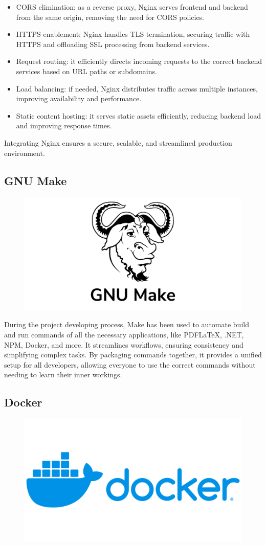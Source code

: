 \begin{itemize}

    \item CORS elimination: as a reverse proxy, Nginx serves frontend and backend from the same origin, removing the need for CORS policies.
    \item HTTPS enablement: Nginx handles TLS termination, securing traffic with HTTPS and offloading SSL processing from backend services.
    \item Request routing: it efficiently directs incoming requests to the correct backend services based on URL paths or subdomains.
    \item Load balancing: if needed, Nginx distributes traffic across multiple instances, improving availability and performance.
    \item Static content hosting: it serves static assets efficiently, reducing backend load and improving response times.

\end{itemize}

Integrating Nginx ensures a secure, scalable, and streamlined production environment.

\subsection{GNU Make}

\begin{figure}[H]
    \hfill
    \includegraphics[width=0.1\linewidth]{../assets/tools-logos/make.png}
    \hspace{1cm}
\end{figure}

During the project developing process, Make has been used to automate build and run commands of all the necessary applications, like PDFLaTeX, .NET, NPM, Docker, and more.
It streamlines workflows, ensuring consistency and simplifying complex tasks.
By packaging commands together, it provides a unified setup for all developers, allowing everyone to use the correct commands without needing to learn their inner workings.

\subsection{Docker}

\begin{figure}[H]
    \hfill
    \includegraphics[width=0.1\linewidth]{../assets/tools-logos/docker.png}
    \hspace{1cm}
\end{figure}

